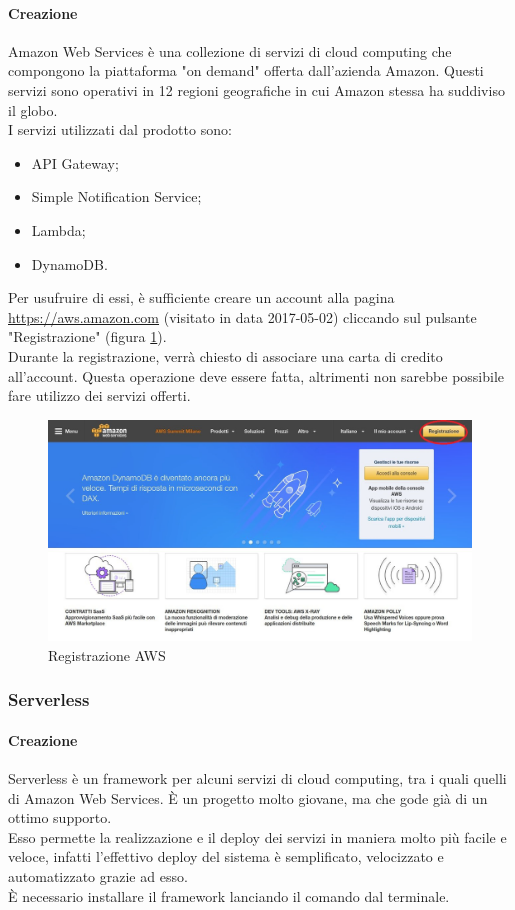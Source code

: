 \paragraph{Creazione}
Amazon Web Services è una collezione di servizi di cloud computing che compongono la piattaforma "on demand" offerta dall'azienda Amazon. Questi servizi sono operativi in 12 regioni geografiche in cui Amazon stessa ha suddiviso il globo.\\
I servizi utilizzati dal prodotto sono:
\begin{itemize}
	\item API Gateway;
	\item Simple Notification Service;
	\item Lambda;
	\item DynamoDB.
\end{itemize}
Per usufruire di essi, è sufficiente creare un account alla pagina \url{https://aws.amazon.com} (visitato in data 2017-05-02) cliccando sul pulsante "Registrazione" (figura \ref{fig:aws}). \\
Durante la registrazione, verrà chiesto di associare una carta di credito all'account. Questa operazione deve essere fatta, altrimenti non sarebbe possibile fare utilizzo dei servizi offerti.
\begin{figure}[h]
\includegraphics[width=\textwidth,height=\textheight,keepaspectratio]{sezioni/images/aws.jpg}
\caption{Registrazione AWS}\label{fig:aws}
\end{figure}
\newpage
\subsubsection{Serverless}
\paragraph{Creazione}
Serverless è un framework per alcuni servizi di cloud computing, tra i quali quelli di Amazon Web Services. È un progetto molto giovane, ma che gode già di un ottimo supporto.\\
Esso permette la realizzazione e il deploy dei servizi in maniera molto più facile e veloce, infatti l'effettivo deploy del sistema è semplificato, velocizzato e automatizzato grazie ad esso. \\
È necessario installare il framework lanciando il comando  dal terminale.

